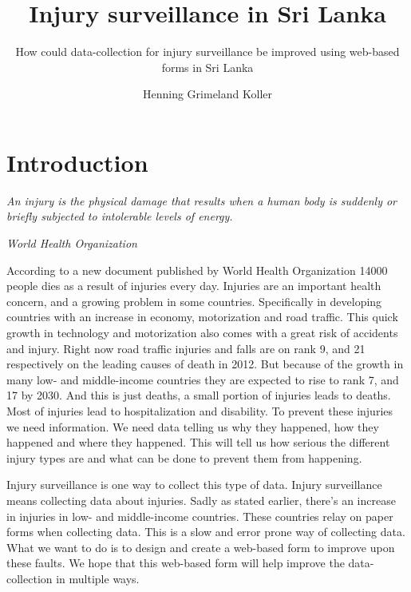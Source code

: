 \documentclass[UKenglish, 12pt]{article}
\title{Injury surveillance in Sri Lanka}
\subtitle{How could data-collection for injury surveillance be improved
using web-based forms in Sri Lanka}
\author{Henning Grimeland Koller}
\newcommand{\WHO}{World Health Organization }
\begin{document}
\ififorside{}
\newpage

\section*{Introduction} 
\epigraph{ \textit{An injury is the physical damage that
results when a human body is suddenly or briefly subjected to intolerable
levels of energy.}}{\textit{\WHO\cite{who-guide}}}

According to a new document published by \WHO\cite{who-article} 14000 people
dies as a result of injuries every day.  Injuries are an important health
concern, and a growing problem in some countries. Specifically in developing
countries with an increase in economy, motorization and road traffic.  This
quick growth in technology and motorization also comes with a great risk of
accidents and injury.  Right now road traffic injuries and falls are on rank 9,
and 21 respectively on the leading causes of death in
2012.\cite[4]{who-article} But because of the growth in many low- and
middle-income countries they are expected to rise to rank 7, and 17 by 2030.
And this is just deaths, a small portion of injuries leads to deaths. Most of
injuries lead to hospitalization and disability.  To prevent these injuries we
need information. We need data telling us why they happened, how they happened
and where they happened.  This will tell us how serious the different injury
types are and what can be done to prevent them from happening.

Injury surveillance is one way to collect this type of data. Injury surveillance
means collecting data about injuries. Sadly as stated earlier, there's an
increase in injuries in low- and middle-income countries. These countries relay
on paper forms when collecting data\cite{standard}.  This is a slow and error
prone way of collecting data. What we want to do is to design and create a
web-based form to improve upon these faults. We hope that this web-based form
will help improve the data-collection in multiple ways.
\end{document}
